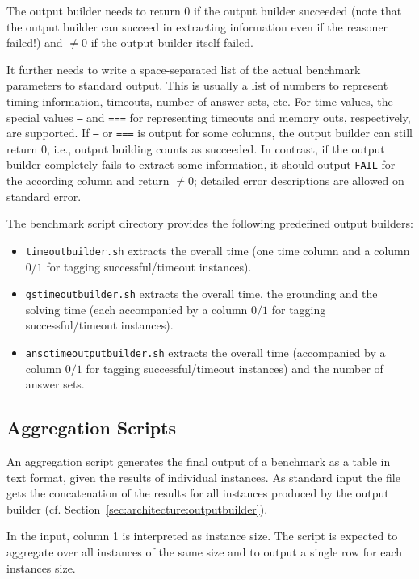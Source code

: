 \documentclass[a4paper]{article}
\begin{document}
			The output builder needs to return $0$ if the output builder succeeded (note that the output builder can succeed in extracting information even if the reasoner failed!)
			and $\not=0$ if the output builder itself failed.
			
			It further needs to write a space-separated list of the actual benchmark parameters to standard output.
			This is usually a list of numbers to represent timing information, timeouts, number of answer sets, etc. For time values,
			the special values {\tt ---} and {\tt ===} for representing timeouts and memory outs, respectively, are supported.
			If {\tt ---} or {\tt ===} is output for some columns, the output builder can still return $0$, i.e.,
			output building counts as succeeded.
			In contrast, if the output builder completely fails to extract some information, it should output {\tt FAIL} for the according column
			and return $\not=0$; detailed error descriptions are allowed on standard error.
			
			The benchmark script directory provides the following predefined output builders:
					
			\begin{itemize}
			    \item {\tt timeoutbuilder.sh} extracts the overall time (one time column and a column $0/1$ for tagging successful/timeout instances).
			    \item {\tt gstimeoutbuilder.sh} extracts the overall time, the grounding and the solving time (each accompanied by a column $0/1$ for tagging successful/timeout instances).
			    \item {\tt ansctimeoutputbuilder.sh} extracts the overall time (accompanied by a column $0/1$ for tagging successful/timeout instances) and the number of answer sets.
			\end{itemize}
	
		\subsection{Aggregation Scripts}
		\label{sec:architecture:aggregate}
	
			An aggregation script
		    generates the final output of a benchmark as a table in text format,
		    given the results of individual instances.
		    As standard input the file gets the concatenation of the results for all instances produced by the output builder (cf. Section~\ref{sec:architecture:outputbuilder}).
	
			In the input, column 1 is interpreted as instance size. The script is expected to aggregate
			over all instances of the same size and to output a single row for each instances size.
	
\end{document}
